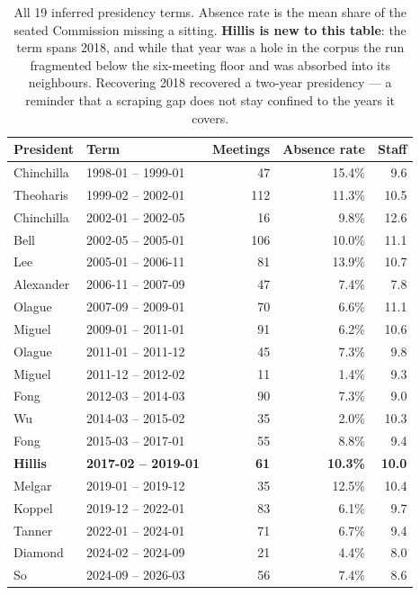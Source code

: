 \documentclass[11pt]{article}
\begin{document}
\begin{table}[h]
\centering
\small
\begin{tabular}{llrrr}
\toprule
President & Term & Meetings & Absence rate & Staff \\
\midrule
Chinchilla & 1998-01 -- 1999-01 &  47 & 15.4\% &  9.6 \\
Theoharis  & 1999-02 -- 2002-01 & 112 & 11.3\% & 10.5 \\
Chinchilla & 2002-01 -- 2002-05 &  16 &  9.8\% & 12.6 \\
Bell       & 2002-05 -- 2005-01 & 106 & 10.0\% & 11.1 \\
Lee        & 2005-01 -- 2006-11 &  81 & 13.9\% & 10.7 \\
Alexander  & 2006-11 -- 2007-09 &  47 &  7.4\% &  7.8 \\
Olague     & 2007-09 -- 2009-01 &  70 &  6.6\% & 11.1 \\
Miguel     & 2009-01 -- 2011-01 &  91 &  6.2\% & 10.6 \\
Olague     & 2011-01 -- 2011-12 &  45 &  7.3\% &  9.8 \\
Miguel     & 2011-12 -- 2012-02 &  11 &  1.4\% &  9.3 \\
Fong       & 2012-03 -- 2014-03 &  90 &  7.3\% &  9.0 \\
Wu         & 2014-03 -- 2015-02 &  35 &  2.0\% & 10.3 \\
Fong       & 2015-03 -- 2017-01 &  55 &  8.8\% &  9.4 \\
\textbf{Hillis} & \textbf{2017-02 -- 2019-01} & \textbf{61} & \textbf{10.3\%} & \textbf{10.0} \\
Melgar     & 2019-01 -- 2019-12 &  35 & 12.5\% & 10.4 \\
Koppel     & 2019-12 -- 2022-01 &  83 &  6.1\% &  9.7 \\
Tanner     & 2022-01 -- 2024-01 &  71 &  6.7\% &  9.4 \\
Diamond    & 2024-02 -- 2024-09 &  21 &  4.4\% &  8.0 \\
So         & 2024-09 -- 2026-03 &  56 &  7.4\% &  8.6 \\
\bottomrule
\end{tabular}
\caption{All 19 inferred presidency terms. Absence rate is the mean share of the seated
Commission missing a sitting. \textbf{Hillis is new to this table}: the term spans 2018, and
while that year was a hole in the corpus the run fragmented below the six-meeting floor and
was absorbed into its neighbours. Recovering 2018 recovered a two-year presidency ---
a reminder that a scraping gap does not stay confined to the years it covers.}
\end{table}
\end{document}

